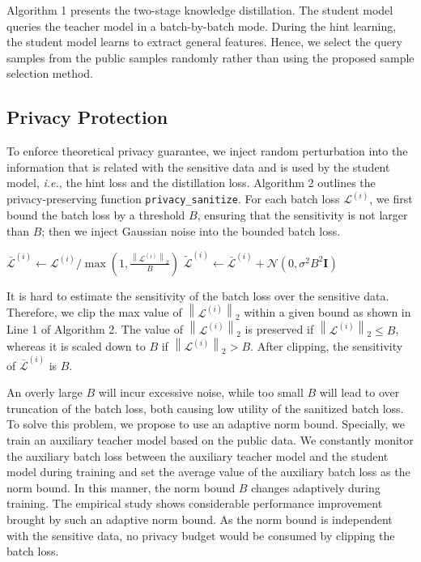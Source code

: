 \documentclass[letterpaper]{article} %
\begin{document}
Algorithm 1 presents the two-stage knowledge distillation. The student model queries the teacher model in a batch-by-batch mode. During the hint learning, the student model learns to extract general features. Hence, we select the query samples from the public samples randomly rather than using the proposed sample selection method.

\subsection{Privacy Protection}
To enforce theoretical privacy guarantee, we inject random perturbation into the information that is related with the sensitive data and is used by the student model, \textit{i.e.}, the hint loss and the distillation loss. Algorithm 2 outlines the privacy-preserving function \texttt{privacy\_sanitize}. For each batch loss $\mathcal{L}^{(i)}$, we first bound the batch loss by a threshold $B$, ensuring that the sensitivity is not larger than $B$; then we inject Gaussian noise into the bounded batch loss.

\begin{algorithm}[tb]
\SetAlgoVlined
\small
{}
$\bar{\mathcal{L}}^{(i)}\gets \mathcal{L}^{(i)}/\max { (1,\frac { \left\| { \mathcal{L}}^{(i)} \right\|_2}{B})}$\;
$\widetilde{\mathcal{L}}^{(i)}\gets \bar{\mathcal{L}}^{(i)} + \mathcal{N}(0,\sigma^2B^2\textbf{I})$\;
\small\caption{Function Privacy Sanitize}
\end{algorithm}

It is hard to estimate the sensitivity of the batch loss over the sensitive data. Therefore, we clip the max value of $ \left\| \mathcal{L}^{(i)} \right\|_2 $ within a given bound as shown in Line 1 of Algorithm 2. The value of $ \left\| \mathcal{L}^{(i)} \right\| _2$ is preserved if $\left\| { \mathcal{L}}^{(i)} \right\|_2\leq B$, whereas it is scaled down to $B$ if $\left\| { \mathcal{L}}^{(i)} \right\|_2> B$. After clipping, the sensitivity of $\bar{\mathcal{L}}^{(i)}$ is $B$.

An overly large $B$ will incur excessive noise, while too small $B$ will lead to over truncation of the batch loss, both causing low utility of the sanitized batch loss. To solve this problem, we propose to use an adaptive norm bound. Specially, we train an auxiliary teacher model based on the public data. We constantly monitor the auxiliary batch loss between the auxiliary teacher model and the student model during training and set the average value of the auxiliary batch loss as the norm bound. In this manner, the norm bound $B$ changes adaptively during training. The empirical study shows considerable performance improvement brought by such an adaptive norm bound. As the norm bound is independent with the sensitive data, no privacy budget would be consumed by clipping the batch loss.
\end{document}
